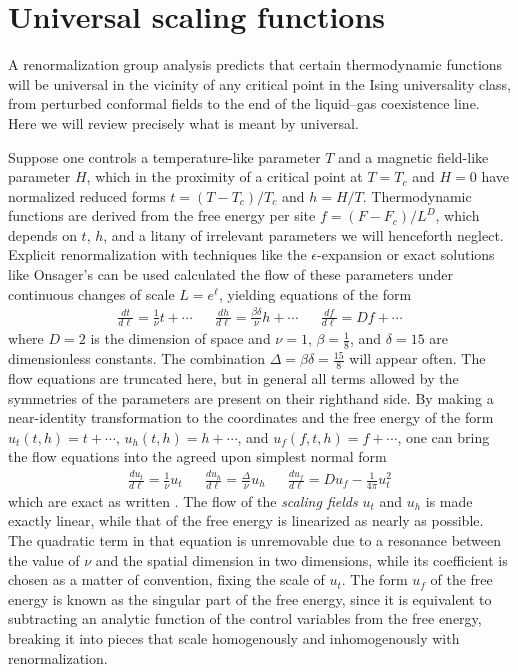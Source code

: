 \documentclass[
aps,
pre,
preprint,
longbibliography,
floatfix
]{revtex4-2}
\begin{document}
\section{Universal scaling functions}

A renormalization group analysis predicts that certain thermodynamic functions
will be universal in the vicinity of any critical point in the Ising
universality class, from perturbed conformal fields to the end of the
liquid--gas coexistence line. Here we will review precisely what is meant by
universal.

Suppose one controls a temperature-like parameter $T$ and a magnetic field-like
parameter $H$, which in the proximity of a critical point at $T=T_c$ and $H=0$
have normalized reduced forms $t=(T-T_c)/T_c$ and $h=H/T$. Thermodynamic
functions are derived from the free energy per site $f=(F-F_c)/L^D$, which
depends on $t$, $h$, and a litany of irrelevant parameters we will henceforth
neglect.  Explicit renormalization with techniques like the
$\epsilon$-expansion or exact solutions like Onsager's can be used calculated
the flow of these parameters under continuous changes of scale $L=e^\ell$,
yielding equations of the form
\begin{align} \label{eq:raw.flow}
  \frac{dt}{d\ell}=\frac1\nu t+\cdots
  &&
  \frac{dh}{d\ell}=\frac{\beta\delta}\nu h+\cdots
  &&
  \frac{df}{d\ell}=Df+\cdots
\end{align}
where $D=2$ is the dimension of space and $\nu=1$, $\beta=\frac18$, and
$\delta=15$ are dimensionless constants. The combination
$\Delta=\beta\delta=\frac{15}8$ will appear often. The flow equations are
truncated here, but in general all terms allowed by the symmetries of the
parameters are present on their righthand side. By making a near-identity
transformation to the coordinates and the free energy of the form $u_t(t,
h)=t+\cdots$, $u_h(t, h)=h+\cdots$, and $u_f(f,t,h)=f+\cdots$, one can bring
the flow equations into the agreed upon simplest normal form
\begin{align} \label{eq:flow}
  \frac{du_t}{d\ell}=\frac1\nu u_t
  &&
  \frac{du_h}{d\ell}=\frac{\Delta}\nu u_h
  &&
  \frac{du_f}{d\ell}=Du_f-\frac1{4\pi}u_t^2
\end{align}
which are exact as written \cite{Raju_2019_Normal}. The flow of the
\emph{scaling fields} $u_t$ and $u_h$ is made exactly linear, while that of the
free energy is linearized as nearly as possible. The quadratic term in that
equation is unremovable due to a resonance between the value of $\nu$ and the
spatial dimension in two dimensions, while its coefficient is chosen as a
matter of convention, fixing the scale of $u_t$. The form $u_f$ of the free
energy is known as the singular part of the free energy, since it is equivalent
to subtracting an analytic function of the control variables from the free
energy, breaking it into pieces that scale homogenously and inhomogenously with
renormalization.
\end{document}
